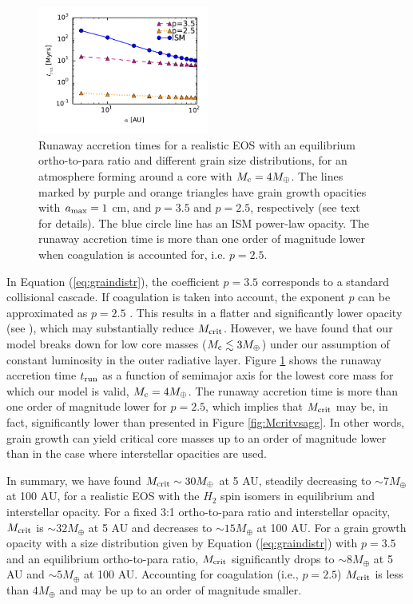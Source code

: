 \begin{figure}[htb]
\centering
\includegraphics[width=0.5\textwidth]{figures/tco_vs_a_Mc4_comp.pdf}
\caption{Runaway accretion times for a realistic EOS with an equilibrium ortho-to-para ratio and different grain size distributions, for an atmosphere forming around a core with $M_{\rm c}=4 M_{\oplus}$. The lines marked by purple and orange triangles have grain growth opacities with $a_{\rm max}=1$ cm, and $p=3.5$ and $p=2.5$, respectively (see text for details). The blue circle line has an ISM power-law opacity. The runaway accretion time is more than one order of magnitude lower when coagulation is accounted for, i.e. $p=2.5$.}
\label{fig:p25p35}
\end{figure}

In Equation (\ref{eq:graindistr}), the coefficient $p=3.5$ corresponds to a standard collisional cascade. If coagulation is taken into account, the exponent $p$ can be approximated as $p=2.5$ \citep{dalessio01}. This results in a flatter and significantly lower opacity (see ), which may substantially reduce $M_{\rm crit}$. However, we have found that our model breaks down for low core masses ($M_{\rm c} \lesssim 3 M_{\oplus}$) under our assumption of constant luminosity in the outer radiative layer. Figure \ref{fig:p25p35} shows the runaway accretion time $t_{\rm run}$ as a function of semimajor axis for the lowest core mass for which our model is valid, $M_{\rm c}=4 M_{\oplus}$. The runaway accretion time is more than one order of magnitude lower for $p=2.5$, which implies that $M_{\rm crit}$ may be, in fact, significantly lower than presented in Figure \ref{fig:Mcritvsagg}. In other words, grain growth can yield critical core masses up to an order of magnitude lower than in the case where interstellar opacities are used.

In summary, we have found $M_{\rm crit}\sim 30 M_{\oplus}$ at 5 AU, steadily decreasing to $\sim$$7 M_{\oplus}$ at 100 AU, for a realistic EOS with the $H_2$ spin isomers in equilibrium and interstellar opacity. For a fixed 3:1 ortho-to-para ratio and interstellar opacity, $M_{\rm crit}$ is $\sim$$32 M_{\oplus}$ at 5 AU and decreases to $\sim$$15 M_{\oplus}$ at 100 AU. For a grain growth opacity with a size distribution given by Equation (\ref{eq:graindistr}) with $p=3.5$ and an equilibrium ortho-to-para ratio, $M_{\rm crit}$ significantly drops to $\sim$$8 M_{\oplus}$ at 5 AU and $\sim$$5 M_{\oplus}$ at 100 AU. Accounting for coagulation (i.e., $p=2.5$) $M_{\rm crit}$ is less than $4M_\oplus$ and may be up to an order of magnitude smaller.

